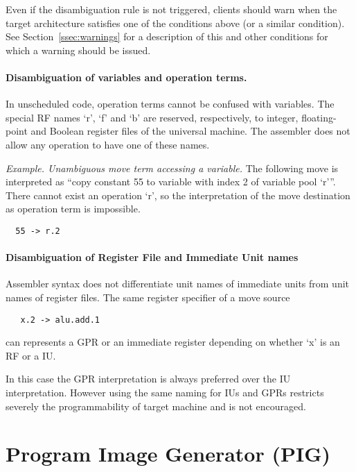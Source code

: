 \documentclass[twoside]{tceusermanual}
\begin{document}
Even if the disambiguation rule is not triggered, clients should warn when
the target architecture satisfies one of the conditions above (or a
similar condition).  See Section~\ref{ssec:warnings} for a description of
this and other conditions for which a warning should be issued.

\paragraph{Disambiguation of variables and operation terms.}
In unscheduled code, operation terms cannot be confused with variables. The
special RF names `r', `f' and `b' are reserved, respectively, to integer,
floating-point and Boolean register files of the universal machine. The
assembler does not allow any operation to have one of these names.
%

\emph{Example. Unambiguous move term accessing a variable.} The following
move is interpreted as ``copy constant 55 to variable with index 2 of
variable pool `r'''. There cannot exist an operation `r', so the
interpretation of the move destination as operation term is impossible.
\begin{verbatim}
  55 -> r.2
\end{verbatim}

\paragraph{Disambiguation of Register File and Immediate Unit names}

Assembler syntax does not differentiate unit names of immediate units from
unit names of register files.  The same register specifier of a move source
\begin{verbatim}
   x.2 -> alu.add.1
\end{verbatim}
can represents a GPR or an immediate register depending on whether `x' is an
RF or a IU.

In this case the GPR interpretation is always preferred over the IU 
interpretation. However using the same naming for IUs and GPRs
restricts severely the programmability of target machine and is not
encouraged.




\section{Program Image Generator (PIG)}
\end{document}
